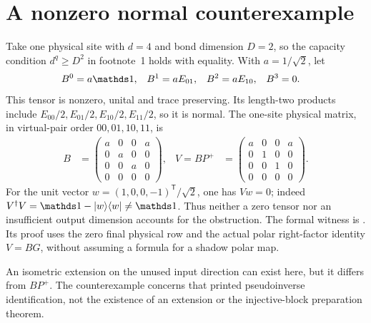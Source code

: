 \documentclass{article}
\begin{document}
\section{A nonzero normal counterexample}
Take one physical site with $d=4$ and bond dimension $D=2$, so the
capacity condition $d^q\ge D^2$ in footnote~1 holds with equality. With
$a=1/\sqrt2$, let
\begin{align}
    B^0 & =a\Id, & B^1 & =aE_{01}, & B^2 & =aE_{10}, & B^3 & =0.
    \label{eq:mswc24_pseudoinverse_witness}
\end{align}
This tensor is nonzero, unital and trace preserving. Its length-two
products include $E_{00}/2,E_{01}/2,E_{10}/2,E_{11}/2$, so it is normal.
The one-site physical matrix, in virtual-pair order $00,01,10,11$, is
\begin{align}
    B      & =\begin{pmatrix}a&0&0&a\\0&a&0&0\\0&0&a&0\\0&0&0&0\end{pmatrix}, &
    V=BP^+ & =\begin{pmatrix}a&0&0&a\\0&1&0&0\\0&0&1&0\\0&0&0&0\end{pmatrix}.
    \label{eq:mswc24_pseudoinverse_witness_matrix}
\end{align}
For the unit vector $w=(1,0,0,-1)^{\mathsf T}/\sqrt2$, one has $Vw=0$;
indeed $V^\dagger V=\Id-|w\rangle\langle w|\ne\Id$.
Thus neither a zero tensor nor an insufficient output dimension accounts
for the obstruction. The formal witness is
.
Its proof uses the zero final physical row and the actual polar
right-factor identity $V=BG$, without assuming a formula for a shadow
polar map.

An isometric extension on the unused input direction can exist here,
but it differs from $BP^+$. The counterexample concerns that printed
pseudoinverse identification, not the existence of an extension or the
injective-block preparation theorem.
\end{document}
